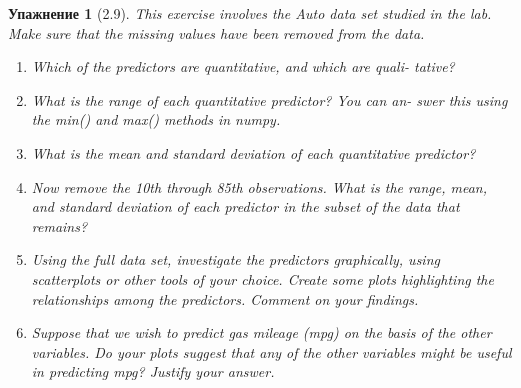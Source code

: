 \documentclass{article}
\newtheorem{exercise}[subsubsection]{Упажнение}
\begin{document}
\begin{exercise}[2.9]
	This exercise involves the Auto data set studied in the lab. Make sure
	that the missing values have been removed from the data.
	\begin{enumerate}[label=(\alph*)]
		\item Which of the predictors are quantitative, and which are quali-
		tative?
		\item  What is the range of each quantitative predictor? You can an-
		swer this using the min() and max() methods in numpy.
		\item What is the mean and standard deviation of each quantitative
		predictor?
		\item  Now remove the 10th through 85th observations. What is the
		range, mean, and standard deviation of each predictor in the
		subset of the data that remains?
		\item Using the full data set, investigate the predictors graphically,
		using scatterplots or other tools of your choice. Create some plots
		highlighting the relationships among the predictors. Comment
		on your findings.
		\item  Suppose that we wish to predict gas mileage (mpg) on the basis
		of the other variables. Do your plots suggest that any of the
		other variables might be useful in predicting mpg? Justify your
		answer.
		
	\end{enumerate}
\end{exercise}
\end{document}
